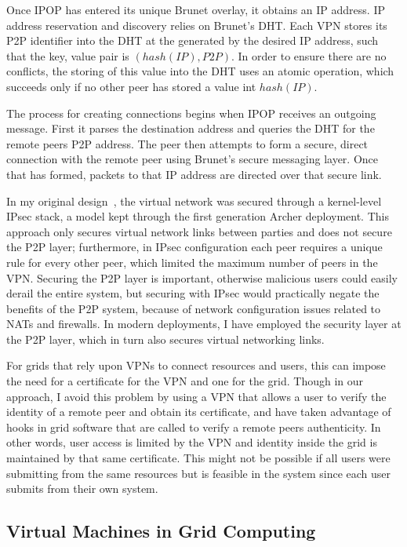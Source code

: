 Once IPOP has entered its unique Brunet overlay, it obtains an IP address.  IP
address reservation and discovery relies on Brunet's DHT.  Each VPN stores its
P2P identifier into the DHT at the generated by the desired IP address, such
that the key, value pair is $(hash(IP), P2P)$.  In order to ensure there are no
conflicts, the storing of this value into the DHT uses an atomic operation,
which succeeds only if no other peer has stored a value int $hash(IP)$.

The process for creating connections begins when IPOP receives an outgoing
message.  First it parses the destination address and queries the DHT for the
remote peers P2P address.  The peer then attempts to form a secure, direct
connection with the remote peer using Brunet's secure messaging layer.  Once
that has formed, packets to that IP address are directed over that secure link.

In my original design~\cite{vtdc}, the virtual network was secured through a
kernel-level IPsec stack, a model kept through the first generation Archer
deployment.  This approach only secures virtual network links between parties
and does not secure the P2P layer; furthermore, in IPsec configuration each
peer requires a unique rule for every other peer, which limited the maximum
number of peers in the VPN.  Securing the P2P layer is important, otherwise
malicious users could easily derail the entire system, but securing with IPsec
would practically negate the benefits of the P2P system, because of network
configuration issues related to NATs and firewalls.  In modern deployments, I
have employed the security layer at the P2P layer, which in turn also secures
virtual networking links.

For grids that rely upon VPNs to connect resources and users, this can impose
the need for a certificate for the VPN and one for the grid.  Though in our
approach, I avoid this problem by using a VPN that allows a user to verify the
identity of a remote peer and obtain its certificate, and have taken advantage
of hooks in grid software that are called to verify a remote peers
authenticity.  In other words, user access is limited by the VPN and identity
inside the grid is maintained by that same certificate.  This might not be
possible if all users were submitting from the same resources but is feasible
in the system since each user submits from their own system.

\subsection{Virtual Machines in Grid Computing}

